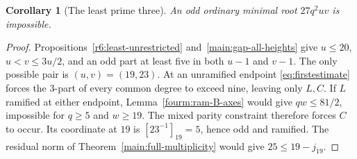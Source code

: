 \documentclass[11pt,a4paper]{article}
\numberwithin{equation}{section}
\newtheorem{corollary}[theorem]{Corollary}
\theoremstyle{remark}
\begin{document}
\begin{corollary}[The least prime three]\label{fam:M:12.3}\label{r6:sextic-three}
An odd ordinary minimal root $27q^2uv$ is impossible.
\end{corollary}
\begin{proof}
Propositions~\ref{r6:least-unrestricted} and~\ref{main:gap-all-heights}
give $u\le20$, $u<v\le3u/2$, and an odd part at least five
in both $u-1$ and $v-1$. The only possible pair is $(u,v)=(19,23)$.
At an unramified endpoint \eqref{eq:firstestimate} forces the
$3$-part of every common degree to exceed nine, leaving only $L,C$.
If $L$ ramified at either endpoint, Lemma~\ref{fourm:ram-B-axes}
would give $qw\le81/2$, impossible for $q\ge5$ and $w\ge19$.
The mixed parity constraint therefore forces $C$ to occur. Its
coordinate at $19$ is $[23^{-1}]_{19}=5$, hence odd and ramified.
The residual norm of Theorem~\ref{main:full-multiplicity}
would give $25\le19-j_{19}$.
\end{proof}
\end{document}
